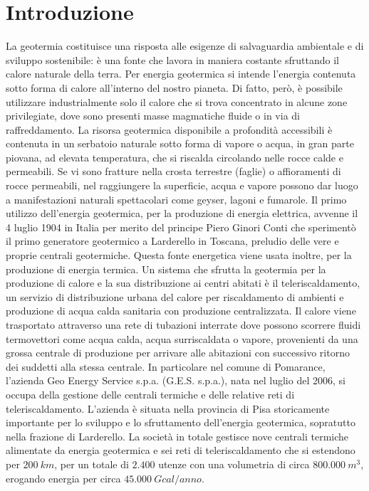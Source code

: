 \documentclass[laurea,oneside,11pt]{USiena_tesiLM}
\begin{document}
\chapter*{Introduzione}
La geotermia costituisce una risposta alle esigenze di salvaguardia ambientale e di sviluppo sostenibile: è una fonte che lavora in maniera costante sfruttando il calore naturale della terra.
Per energia geotermica si intende l'energia contenuta sotto forma di calore all'interno del nostro pianeta. Di fatto, però, è possibile utilizzare industrialmente solo il calore che si trova concentrato in alcune zone privilegiate, dove sono presenti masse magmatiche fluide o in via di raffreddamento. La risorsa geotermica disponibile a profondità accessibili è contenuta in un serbatoio naturale sotto forma di vapore o acqua, in gran parte piovana, ad elevata temperatura, che si riscalda circolando nelle rocce calde e permeabili. Se vi sono fratture nella crosta terrestre (faglie) o affioramenti di rocce permeabili, nel raggiungere la superficie, acqua e vapore possono dar luogo a manifestazioni naturali spettacolari come geyser, lagoni e fumarole.
Il primo utilizzo dell'energia geotermica, per la produzione di energia elettrica, avvenne il 4 luglio 1904 in Italia per merito del principe Piero Ginori Conti che sperimentò il primo generatore geotermico a Larderello in Toscana, preludio delle vere e proprie centrali geotermiche. 
Questa fonte energetica viene usata inoltre, per la produzione di energia termica. Un sistema che sfrutta la geotermia per la produzione di calore e la sua distribuzione  ai centri abitati è il teleriscaldamento,  un  servizio  di  distribuzione  urbana  del calore per  riscaldamento di ambienti e produzione di acqua calda sanitaria con produzione centralizzata. Il calore viene trasportato attraverso una rete di tubazioni interrate dove possono scorrere  fluidi termovettori come acqua calda, acqua surriscaldata o vapore, provenienti da una grossa centrale di produzione per arrivare alle abitazioni con successivo ritorno dei suddetti alla stessa centrale.
In particolare nel comune di Pomarance, l'azienda Geo Energy Service s.p.a. (G.E.S. s.p.a.), nata nel luglio del 2006, si occupa della gestione delle centrali termiche e delle relative reti di teleriscaldamento. L'azienda è situata nella provincia di Pisa storicamente importante per lo sviluppo e lo sfruttamento dell'energia geotermica, sopratutto nella frazione di Larderello. La società in totale gestisce nove centrali termiche alimentate da energia geotermica e sei reti di teleriscaldamento che si estendono per $200 \ km$, per un totale di $2.400$ utenze con una volumetria di circa $800.000 \ m^3$, erogando energia per circa $45.000 \ Gcal/anno$. 
\end{document}
